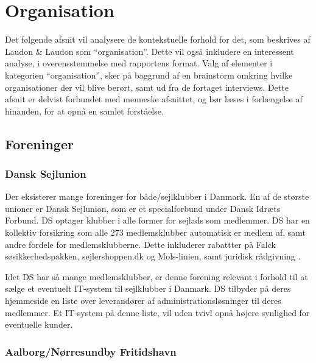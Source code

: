 \section{Organisation}

Det følgende afsnit vil analysere de kontekstuelle forhold for det, som beskrives af Laudon \& Laudon som \enquote{organisation}. Dette vil også inkludere en interessent analyse, i overensstemmelse med rapportens format. Valg af elementer i kategorien \enquote{organisation}, sker på baggrund af en brainstorm omkring hvilke organisationer der vil blive berørt, samt ud fra de fortaget interviews. Dette afsnit er delvist forbundet med menneske afsnittet, og bør læses i forlængelse af hinanden, for at opnå en samlet forståelse.

\subsection{Foreninger} %
\label{sub:Foreninger}

\subsubsection{Dansk Sejlunion} %
\label{ssub:Dansk Sejlunion}

Der eksisterer mange foreninger for både/sejlklubber i Danmark. En af de største unioner er Dansk Sejlunion, som er et specialforbund under Dansk Idræts Forbund. DS optager klubber i alle former for sejlads som medlemmer. DS har en kollektiv forsikring som alle 273 medlemsklubber automatisk er medlem af, samt andre fordele for medlemsklubberne. Dette inkluderer rabattter på Falck søsikkerhedspakken, sejlershoppen.dk og Mols-linien, samt juridisk rådgivning \cite{ds_optagelse,ds_fordele}.

Idet DS har så mange medlemsklubber, er denne forening relevant i forhold til at sælge et eventuelt IT-system til sejlklubber i Danmark. DS tilbyder på deres hjemmeside en liste over leverandører af administrationsløsninger til deres medlemmer. Et IT-system på denne liste, vil uden tvivl opnå højere synlighed for eventuelle kunder.\cite{DanskSejlunionKlubAdmin}


\subsubsection{Aalborg/Nørresundby Fritidshavn}

